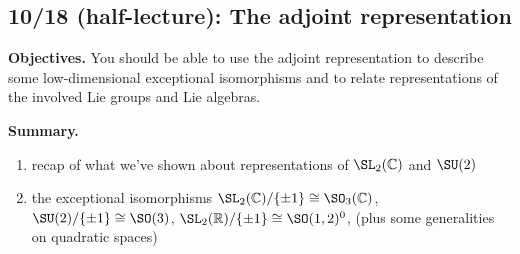 \documentclass[reqno]{amsart} 
\begin{document}
\newpage
\subsection{10/18 (half-lecture): The adjoint representation}
\label{sec:org019e4bd}
\textbf{Objectives.} You should be able to use the adjoint representation to describe some low-dimensional exceptional isomorphisms and to relate representations of the involved Lie groups and Lie algebras.

\textbf{Summary.}
\begin{enumerate}
\item recap of what we've shown about representations of \(\SL_2(\mathbb{C})\) and \(\SU(2)\)
\item the exceptional isomorphisms \(\SL_2(\mathbb{C})/ \{\pm 1\} \cong \SO_3(\mathbb{C})\), \(\SU(2) / \{\pm 1\} \cong \SO(3)\), \(\SL_2(\mathbb{R})/ \{\pm 1\} \cong \SO(1,2)^0\), (plus some generalities on quadratic spaces)
\end{enumerate}
\end{document}
